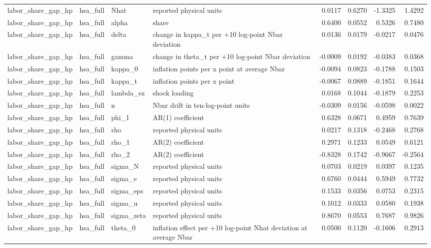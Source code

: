\begin{tabular}{llllrrrr}
labor\_share\_gap\_hp & hsa\_full & Nhat & reported physical units & 0.0117 & 0.6270 & -1.3325 & 1.4292 \\
labor\_share\_gap\_hp & hsa\_full & alpha & share & 0.6400 & 0.0552 & 0.5326 & 0.7480 \\
labor\_share\_gap\_hp & hsa\_full & delta & change in kappa\_t per +10 log-point Nbar deviation & 0.0136 & 0.0179 & -0.0217 & 0.0476 \\
labor\_share\_gap\_hp & hsa\_full & gamma & change in theta\_t per +10 log-point Nbar deviation & -0.0009 & 0.0192 & -0.0383 & 0.0368 \\
labor\_share\_gap\_hp & hsa\_full & kappa\_0 & inflation points per x point at average Nbar & -0.0094 & 0.0823 & -0.1788 & 0.1503 \\
labor\_share\_gap\_hp & hsa\_full & kappa\_t & inflation points per x point & -0.0067 & 0.0889 & -0.1851 & 0.1644 \\
labor\_share\_gap\_hp & hsa\_full & lambda\_ez & shock loading & 0.0168 & 0.1044 & -0.1879 & 0.2253 \\
labor\_share\_gap\_hp & hsa\_full & n & Nbar drift in ten-log-point units & -0.0309 & 0.0156 & -0.0598 & 0.0022 \\
labor\_share\_gap\_hp & hsa\_full & phi\_1 & AR(1) coefficient & 0.6328 & 0.0671 & 0.4959 & 0.7639 \\
labor\_share\_gap\_hp & hsa\_full & rho & reported physical units & 0.0217 & 0.1318 & -0.2468 & 0.2768 \\
labor\_share\_gap\_hp & hsa\_full & rho\_1 & AR(2) coefficient & 0.2971 & 0.1233 & 0.0549 & 0.6121 \\
labor\_share\_gap\_hp & hsa\_full & rho\_2 & AR(2) coefficient & -0.8328 & 0.1742 & -0.9667 & -0.2564 \\
labor\_share\_gap\_hp & hsa\_full & sigma\_N & reported physical units & 0.0703 & 0.0219 & 0.0397 & 0.1235 \\
labor\_share\_gap\_hp & hsa\_full & sigma\_e & reported physical units & 0.6760 & 0.0444 & 0.5949 & 0.7732 \\
labor\_share\_gap\_hp & hsa\_full & sigma\_eps & reported physical units & 0.1533 & 0.0356 & 0.0753 & 0.2315 \\
labor\_share\_gap\_hp & hsa\_full & sigma\_u & reported physical units & 0.1012 & 0.0333 & 0.0580 & 0.1938 \\
labor\_share\_gap\_hp & hsa\_full & sigma\_zeta & reported physical units & 0.8670 & 0.0553 & 0.7687 & 0.9826 \\
labor\_share\_gap\_hp & hsa\_full & theta\_0 & inflation effect per +10 log-point Nhat deviation at average Nbar & 0.0500 & 0.1120 & -0.1606 & 0.2913 \\

\end{tabular}

